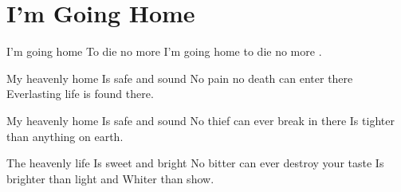 \starttocol
\chapter{I'm Going Home}
\nexttocol
\hfill{\it }
\stoptocol
\starttocol
\startlines
{\sc I'm} going home 
To die no more
I'm going home to die no more .

My heavenly home
Is safe and sound
No pain no death can enter there
Everlasting life is found there.

My heavenly home
Is safe and sound
No thief can ever break in there
Is tighter than anything on earth.

The heavenly life
Is sweet and bright
No bitter can ever destroy your taste
Is brighter than light and
Whiter than show.
\stoplines
\nexttocol

\stoptocol
